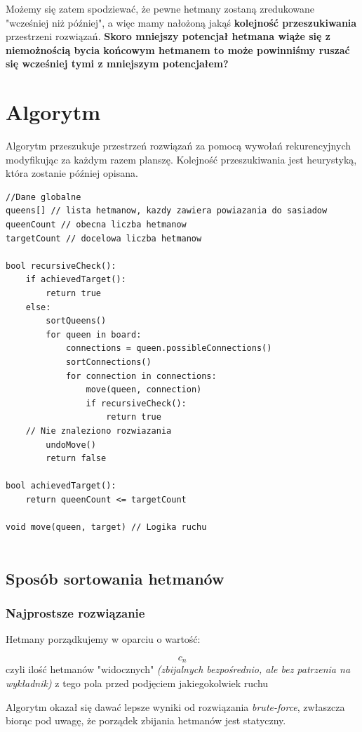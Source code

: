 \documentclass{article}
\begin{document}
Możemy się zatem spodziewać, że pewne hetmany zostaną zredukowane "wcześniej niż później", a więc mamy nałożoną jakąś \textbf{kolejność przeszukiwania} przestrzeni rozwiązań. \textbf{Skoro mniejszy potencjał hetmana wiąże się z niemożnością bycia końcowym hetmanem to może powinniśmy ruszać się  wcześniej tymi z mniejszym potencjałem?}

\section{Algorytm}

Algorytm przeszukuje przestrzeń rozwiązań za pomocą wywołań rekurencyjnych modyfikując za każdym razem planszę. Kolejność przeszukiwania jest heurystyką, która zostanie później opisana.

\begin{lstlisting}
//Dane globalne
queens[] // lista hetmanow, kazdy zawiera powiazania do sasiadow
queenCount // obecna liczba hetmanow
targetCount // docelowa liczba hetmanow

bool recursiveCheck():
	if achievedTarget():
		return true
	else:
		sortQueens()
		for queen in board:
			connections = queen.possibleConnections()
			sortConnections()
			for connection in connections:
				move(queen, connection)
				if recursiveCheck():
					return true
	// Nie znaleziono rozwiazania	
		undoMove()	
		return false
		
bool achievedTarget():
	return queenCount <= targetCount

void move(queen, target) // Logika ruchu	
	
\end{lstlisting}

\clearpage

\subsection{Sposób sortowania hetmanów}

\subsubsection{Najprostsze rozwiązanie}

Hetmany porządkujemy w oparciu o wartość:

$$c_n$$
czyli ilość hetmanów "widocznych" \textit{(zbijalnych bezpośrednio, ale bez patrzenia na wykładnik)} z tego pola przed podjęciem jakiegokolwiek ruchu

Algorytm okazał się dawać lepsze wyniki od rozwiązania \textit{brute-force}, zwłaszcza biorąc pod uwagę, że porządek zbijania hetmanów jest statyczny.
\end{document}

